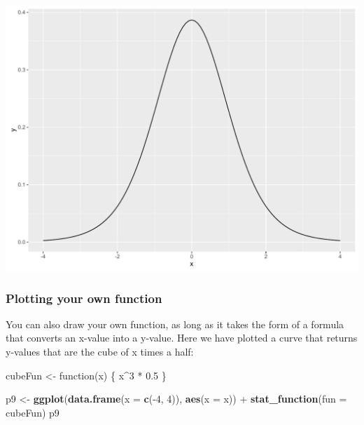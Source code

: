\documentclass[]{article}
\newenvironment{Shaded}{\begin{snugshade}}{\end{snugshade}}
\newcommand{\KeywordTok}[1]{\textcolor[rgb]{0.13,0.29,0.53}{\textbf{{#1}}}}
\newcommand{\DataTypeTok}[1]{\textcolor[rgb]{0.13,0.29,0.53}{{#1}}}
\newcommand{\DecValTok}[1]{\textcolor[rgb]{0.00,0.00,0.81}{{#1}}}
\newcommand{\FloatTok}[1]{\textcolor[rgb]{0.00,0.00,0.81}{{#1}}}
\newcommand{\StringTok}[1]{\textcolor[rgb]{0.31,0.60,0.02}{{#1}}}
\newcommand{\NormalTok}[1]{{#1}}
\begin{document}
\begin{center}\includegraphics{0_all_posts_pdf/function_2-1} \end{center}

\subsubsection{Plotting your own
function}\label{plotting-your-own-function}

You can also draw your own function, as long as it takes the form of a
formula that converts an x-value into a y-value. Here we have plotted a
curve that returns y-values that are the cube of x times a half:

\begin{Shaded}
\begin{Highlighting}[]
\NormalTok{cubeFun <-}\StringTok{ }\NormalTok{function(x) \{}
    \NormalTok{x^}\DecValTok{3} \NormalTok{*}\StringTok{ }\FloatTok{0.5}
\NormalTok{\}}

\NormalTok{p9 <-}\StringTok{ }\KeywordTok{ggplot}\NormalTok{(}\KeywordTok{data.frame}\NormalTok{(}\DataTypeTok{x =} \KeywordTok{c}\NormalTok{(-}\DecValTok{4}\NormalTok{, }\DecValTok{4}\NormalTok{)), }\KeywordTok{aes}\NormalTok{(}\DataTypeTok{x =} \NormalTok{x)) +}
\StringTok{      }\KeywordTok{stat_function}\NormalTok{(}\DataTypeTok{fun =} \NormalTok{cubeFun)}
\NormalTok{p9}
\end{Highlighting}
\end{Shaded}
\end{document}
